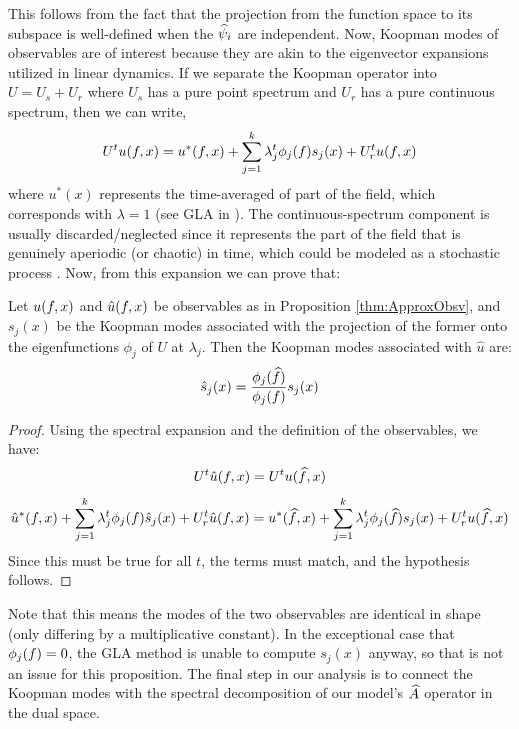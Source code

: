 This follows from the fact that the projection from the function space to its subspace is well-defined when the $\widehat{\psi}_i$ are independent. Now, Koopman modes of observables are of interest because they are akin to the eigenvector expansions utilized in linear dynamics. If we separate the Koopman operator into $U = U_s + U_r$ where $U_s$ has a pure point spectrum and $U_r$ has a pure continuous spectrum, then we can write,
\begin{align} \eqlabel{spectral_expansion}
U^t u(\fspaceEl,x) = u^{\ast}(\fspaceEl,x) + \sum_{j=1}^k \lambda_j^t \phi_j(\fspaceEl) s_j (x)  +  U_r^t u(\fspaceEl,x)
\end{align}
where $u^{\ast}(x)$ represents the time-averaged of part of the field, which corresponds with $\lambda=1$ (see GLA in \cite{mezic2013analysis}). The continuous-spectrum component is usually discarded/neglected since it represents the part of the field that is genuinely aperiodic (or chaotic) in time, which could be modeled as a stochastic process \cite{mezic2013analysis}. Now, from this expansion we can prove that:

\begin{proposition}\label{prop:ApproxModes}
	Let $u(f,x)$ and $\hat u(f,x)$ be observables as in Proposition \ref{thm:ApproxObsv}, and $s_j(x)$ be the Koopman modes associated with the projection of the former onto the eigenfunctions $\phi_j$ of $U$ at $\lambda_j$. Then the Koopman modes associated with $\hat u$ are:
	\begin{align}
	\hat s_j(x) = \frac{\phi_j(\widehat{f})}{\phi_j(f)} s_j(x)
	\end{align}
\end{proposition}
\begin{proof}
	Using the spectral expansion and the definition of the observables, we have:
	$$U^t \hat u(f,x) = U^t u(\widehat{f},x) $$
	$$ \hat u^{\ast}(f,x) + \sum_{j=1}^k \lambda_j^t \phi_j(f) \hat s_j (x)  +  U_r^t \hat u(f,x) = u^{\ast}(\widehat{f},x) + \sum_{j=1}^k \lambda_j^t \phi_j(\widehat{f}) s_j (x)  +  U_r^t u(\widehat{f},x)$$
	Since this must be true for all $t$, the terms must match, and the hypothesis follows.%
\end{proof}


Note that this means the modes of the two observables are identical in shape (only differing by a multiplicative constant). In the exceptional case that $\phi_j(f)=0$, the GLA method is unable to compute $s_j (x)$ anyway, so that is not an issue for this proposition. The final step in our analysis is to connect the Koopman modes with the spectral decomposition of  our model's $\widehat{A}$ operator in the dual space.


